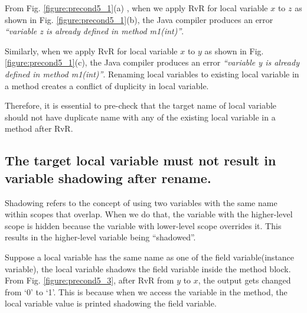  
From Fig. \ref{figure:precond5_1}(a) , when we apply RvR for local variable $x$ to $z$ as shown in Fig. \ref{figure:precond5_1}(b), the Java compiler produces an error \textit{``variable z is already defined in method m1(int)''}. 

Similarly, when we apply RvR for local variable $x$ to $y$ as shown in Fig. \ref{figure:precond5_1}(c), the Java compiler produces an error \textit{``variable y is already defined in method m1(int)''}. Renaming local variables to existing local variable in a method creates a conflict of duplicity in local variable.

Therefore, it is essential to pre-check that the target name of local variable should not have duplicate name with any of the existing local variable in a method after RvR.


\subsection{The target local variable must not result in variable shadowing after rename.}
Shadowing refers to the concept of using two variables with the same name within scopes that overlap. When we do that, the variable with the higher-level scope is hidden because the variable with lower-level scope overrides it. This results in the higher-level variable being ``shadowed''. 

Suppose a local variable has the same name as one of the field variable(instance variable), the local variable shadows the field variable inside the method block. From Fig. \ref{figure:precond5_3}, after RvR from $y$ to $x$, the output gets changed from `0' to `1'. This is because when we access the variable in the method, the local variable value is printed shadowing the field variable.

